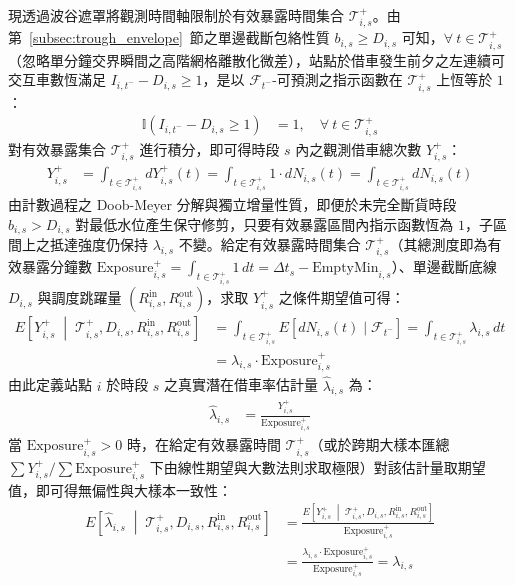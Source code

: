 現透過波谷遮罩將觀測時間軸限制於有效暴露時間集合 $\mathcal{T}^+_{i,s}$。由第~\ref{subsec:trough_envelope}~節之單邊截斷包絡性質 $b_{i,s} \ge D_{i,s}$ 可知，$\forall\ t \in \mathcal{T}^+_{i,s}$（忽略單分鐘交界瞬間之高階網格離散化微差），站點於借車發生前夕之左連續可交互車數恆滿足 $I_{i,t^-} - D_{i,s} \ge 1$，是以 $\mathcal{F}_{t^-}$-可預測之指示函數在 $\mathcal{T}^+_{i,s}$ 上恆等於 $1$：
\begin{align}
\mathbb{I}\left(I_{i,t^-} - D_{i,s} \ge 1\right) &= 1, \quad \forall\ t \in \mathcal{T}^+_{i,s}
\end{align}
對有效暴露集合 $\mathcal{T}^+_{i,s}$ 進行積分，即可得時段 $s$ 內之觀測借車總次數 $Y^+_{i,s}$：
\begin{align}
Y^+_{i,s} &= \int_{t \in \mathcal{T}^+_{i,s}} dY^+_{i,s}(t) = \int_{t \in \mathcal{T}^+_{i,s}} 1 \cdot dN_{i,s}(t) = \int_{t \in \mathcal{T}^+_{i,s}} dN_{i,s}(t)
\end{align}
由計數過程之 Doob-Meyer 分解與獨立增量性質，即便於未完全斷貨時段 $b_{i,s} > D_{i,s}$ 對最低水位產生保守修剪，只要有效暴露區間內指示函數恆為 $1$，子區間上之抵達強度仍保持 $\lambda_{i,s}$ 不變。給定有效暴露時間集合 $\mathcal{T}^+_{i,s}$（其總測度即為有效暴露分鐘數 $\text{Exposure}^+_{i,s} = \int_{t \in \mathcal{T}^+_{i,s}} 1 \, dt = \Delta t_s - \text{EmptyMin}_{i,s}$）、單邊截斷底線 $D_{i,s}$ 與調度跳躍量 $(R^{\text{in}}_{i,s}, R^{\text{out}}_{i,s})$，求取 $Y^+_{i,s}$ 之條件期望值可得：
\begin{equation}
\begin{aligned}
E\left[Y^+_{i,s} \;\middle|\; \mathcal{T}^+_{i,s}, D_{i,s}, R^{\text{in}}_{i,s}, R^{\text{out}}_{i,s}\right] &= \int_{t \in \mathcal{T}^+_{i,s}} E\left[dN_{i,s}(t) \mid \mathcal{F}_{t^-}\right] = \int_{t \in \mathcal{T}^+_{i,s}} \lambda_{i,s} \, dt \\
&= \lambda_{i,s} \cdot \text{Exposure}^+_{i,s}
\end{aligned}
\end{equation}
由此定義站點 $i$ 於時段 $s$ 之真實潛在借車率估計量 $\hat{\lambda}_{i,s}$ 為：
\begin{align}
\hat{\lambda}_{i,s} &= \frac{Y^+_{i,s}}{\text{Exposure}^+_{i,s}}
\end{align}
當 $\text{Exposure}^+_{i,s} > 0$ 時，在給定有效暴露時間 $\mathcal{T}^+_{i,s}$（或於跨期大樣本匯總 $\sum Y^+_{i,s} / \sum \text{Exposure}^+_{i,s}$ 下由線性期望與大數法則求取極限）對該估計量取期望值，即可得無偏性與大樣本一致性：
\begin{equation}
\begin{aligned}
E\left[\hat{\lambda}_{i,s} \;\middle|\; \mathcal{T}^+_{i,s}, D_{i,s}, R^{\text{in}}_{i,s}, R^{\text{out}}_{i,s}\right] &= \frac{E\left[Y^+_{i,s} \;\middle|\; \mathcal{T}^+_{i,s}, D_{i,s}, R^{\text{in}}_{i,s}, R^{\text{out}}_{i,s}\right]}{\text{Exposure}^+_{i,s}} \\
&= \frac{\lambda_{i,s} \cdot \text{Exposure}^+_{i,s}}{\text{Exposure}^+_{i,s}} = \lambda_{i,s}
\end{aligned}
\end{equation}
